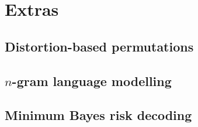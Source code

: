 \section{Extras}

\subsection{Distortion-based permutations}

\subsection{$n$-gram language modelling}

\subsection{Minimum Bayes risk decoding}

